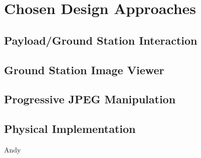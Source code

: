 \chapter{Chosen Design Approaches}




\section{Payload/Ground Station Interaction}

\section{Ground Station Image Viewer}

\section{Progressive JPEG Manipulation}

\section{Physical Implementation}
Andy


